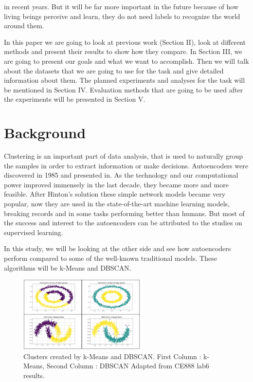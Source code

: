 \documentclass[journal]{IEEEtran}
\begin{document}
in recent years. But it will be far more important in the future because of how living beings perceive and learn, they do not
need labels to recognize the world around them.\par In this paper we are going to look at previous work (Section II),
look at different methods and present their results to show how they compare. In Section III, we are going to present 
our goals and what we want to accomplish. Then we will talk about the datasets that we are going to use for the task and 
give detailed information about them. The planned experiments and analyses for the task will be mentioned in Section IV.
Evaluation methods that are going to be used after the experiments will be presented in Section V.

\section{Background}
Clustering is an important part of data analysis, that is used to naturally group the samples in order to extract information or make decisions\cite{jain1999data}.
Autoencoders were discovered in 1985 and presented in\cite{rumelhart1985learning}. As the technology and our computational power improved immensely in the last decade, they became more and more feasible. After Hinton's solution\cite{hinton2006fast} these simple network models became very popular, now they are used in the state-of-the-art machine learning models, breaking records and in some tasks performing better than humans\cite{schmidhuber2015deep}. But most of the success and interest to the autoencoders can be attributed to the studies on supervised learning.\par
In this study, we will be looking at the other side and see how autoencoders perform compared to some of the well-known traditional models. These algorithms will be k-Means\cite{macqueen1967some} and DBSCAN\cite{ester1996density}.

\begin{figure}[!ht]
  \centering
  \includegraphics[width=2.5in]{images/kM_DBSCAN.png}
  \caption{Clusters created by k-Means and DBSCAN.
  First Column : k-Means, Second Column : DBSCAN \newline
  Adapted from CE888 lab6 results.
  }
  \label{fig_cluster}
  \end{figure}
\end{document}
